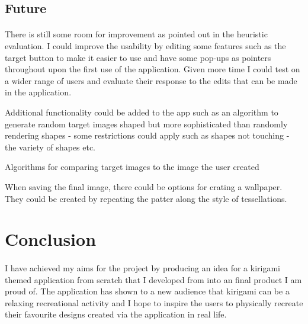 \documentclass[11pt]{article}
\begin{document}
    \subsection{Future}
        
                \paragraph{}
                
                There is still some room for improvement as pointed out in the heuristic evaluation. I could improve the usability by editing some features such as the target button to make it easier to use and have some pop-ups as pointers throughout upon the first use of the application. Given more time I could test on a wider range of users and evaluate their response to the edits that can be made in the application. 
                
                
                Additional functionality could be added to the app such as an algorithm to generate random target images shaped but more sophisticated than randomly rendering shapes - some restrictions could apply such as shapes not touching - the variety of shapes etc.
                
                Algorithms for comparing target images to the image the user created

                When saving the final image, there could be options for crating a wallpaper. They could be created by repeating the patter
                along the style of tessellations. 

\newpage
\section{Conclusion}
        
            \paragraph{}
            
            
            
            I have achieved my aims for the project by producing an idea for a kirigami themed application from scratch that I developed from into an final product I am proud of. The application has shown to a new audience that kirigami can be a relaxing recreational activity and I hope to inspire the users to physically recreate their favourite designs created via the application in real life.
\end{document}

